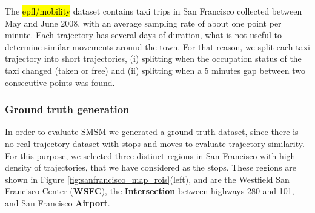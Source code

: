 \documentclass[12pt]{article}
\begin{document}
The \hl{epfl/mobility} dataset contains taxi trips in San Francisco collected between May and June 2008, with an average sampling rate of about one point per minute. Each trajectory has several days of duration, what is not useful to determine similar movements around the town. For that reason, we split each taxi trajectory into short trajectories, (i) splitting when the occupation status of the taxi changed (taken or free) and (ii) splitting when a 5 minutes gap between two consecutive points was found.

\subsubsection{Ground truth generation}
In order to evaluate SMSM we generated a ground truth dataset, since there is no real trajectory dataset with stops and moves to evaluate trajectory similarity. For this purpose, we selected three distinct regions in San Francisco with high density of trajectories, that we have considered as the stops. These regions are shown in Figure \ref{fig:sanfrancisco_map_rois}(left), and are the Westfield San Francisco Center (\textbf{WSFC}), the \textbf{Intersection} between highways 280 and 101, and San Francisco \textbf{Airport}. 
\end{document}
